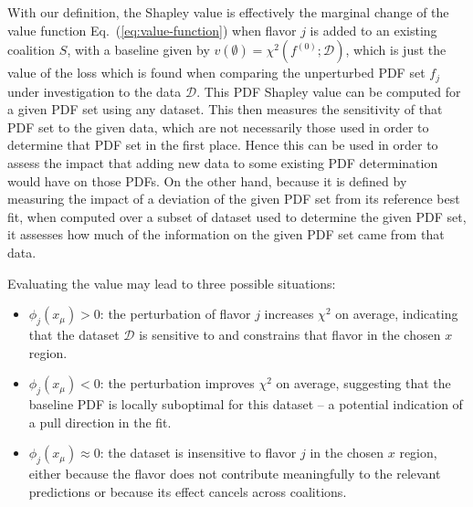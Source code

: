 \documentclass[11pt,a4paper]{article}
\begin{document}
With our definition, the Shapley value is effectively the marginal change of the value function  Eq.~(\ref{eq:value-function}) when flavor $j$ is added to an existing coalition $S$, with a baseline given by  $v(\emptyset)=\chi^2(f^{(0)};\mathcal{D})$, which is just   the value of the loss which is found when comparing the unperturbed PDF set $f_j$ under investigation to the data $\mathcal{D}$. 
This PDF Shapley value can be computed for a given PDF set using any dataset. This then measures the sensitivity of that PDF set to the given data, which are not necessarily those used in order to determine that PDF set in the first place. Hence this can be used in order to assess the impact that adding new data to some existing PDF determination would have on those PDFs. On the other hand, because it is defined by measuring the impact of a deviation of the given PDF set from its reference best fit, when computed over a subset of  dataset used to determine the given PDF set, it assesses how much of the information on the given PDF set came from that data.

Evaluating the value may lead to three possible situations:
\begin{itemize}
  \item $\phi_j(x_\mu)>0$: the perturbation of flavor $j$ increases $\chi^2$ on average, indicating that the dataset $\mathcal{D}$ is sensitive to and constrains that flavor in the chosen $x$ region.

  \item $\phi_j(x_\mu)<0$: the perturbation improves $\chi^2$ on average, suggesting that the baseline PDF is locally suboptimal for this dataset -- a potential indication of a pull direction in the fit.

  \item $\phi_j(x_\mu)\approx 0$: the dataset is insensitive to flavor $j$ in the chosen $x$ region, either because the flavor does not contribute meaningfully to the relevant predictions or because its effect cancels across coalitions.
\end{itemize}
\end{document}
